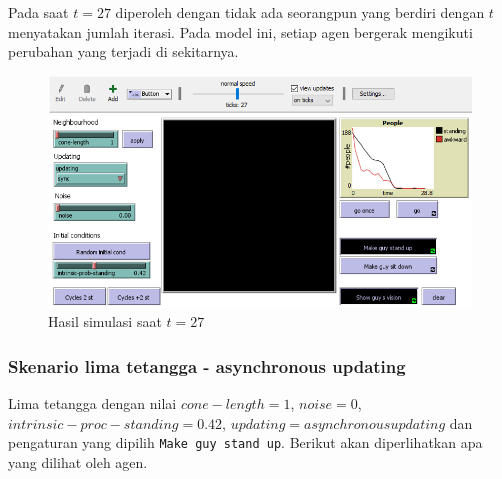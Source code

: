 Pada saat $t=27$ diperoleh dengan tidak ada seorangpun yang berdiri dengan $t$ menyatakan jumlah iterasi. Pada model ini, setiap agen bergerak mengikuti perubahan yang terjadi di sekitarnya.

\begin{figure}[H]
\centering
\includegraphics[width=\linewidth]{images/ch03/sop4}
\caption{Hasil simulasi saat $t=27$}
\label{fig:sop4}
\end{figure}

\subsubsection{Skenario lima tetangga - asynchronous updating}

Lima tetangga dengan nilai $cone-length=1$, $noise=0$, $intrinsic-proc-standing=0.42$, $updating=asynchronous updating$ dan pengaturan yang dipilih \texttt{Make guy stand up}. Berikut akan diperlihatkan apa yang dilihat oleh agen.

